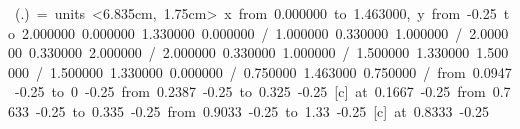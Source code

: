 \mbox{\beginpicture
\def\mutation{\tiny$\bullet$}
\linethickness=0.75pt
\setplotsymbol ({\small .})
=\baselineskip
{}\baselineskip
%
\setcoordinatesystem units <6.835cm, 1.75cm>
\setplotarea x from 0.000000 to 1.463000, y from -0.25 to 2.000000
 0.000000 1.330000 0.000000 /
 1.000000 0.330000 1.000000 /
 2.000000 0.330000 2.000000 /
 2.000000 0.330000 1.000000 /
 1.500000 1.330000 1.500000 /
 1.500000 1.330000 0.000000 /
 0.750000 1.463000 0.750000 /
\arrow <5pt> [.2,.67] from 0.0947 -0.25 to 0 -0.25
\arrow <5pt> [.2,.67] from 0.2387 -0.25 to 0.325 -0.25
 [c] at 0.1667 -0.25
\arrow <5pt> [.2,.67] from 0.7633 -0.25 to 0.335 -0.25
\arrow <5pt> [.2,.67] from 0.9033 -0.25 to 1.33 -0.25
 [c] at 0.8333 -0.25
\endpicture}
